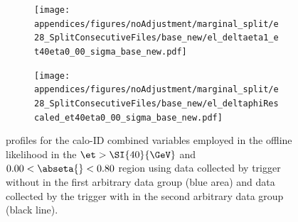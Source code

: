 \begin{figure}[t]
\begin{center}
\begin{subfigure}[c]{.48\textwidth}
\centering
\texttt{[image: appendices/figures/noAdjustment/marginal\_split/e28\_SplitConsecutiveFiles/base\_new/el\_deltaeta1\_et40eta0\_00\_sigma\_base\_new.pdf]}
\caption{}%
\label{fig:groups_homogeneity_deta}
\end{subfigure}
\begin{subfigure}[c]{.48\textwidth}
\centering
\texttt{[image: appendices/figures/noAdjustment/marginal\_split/e28\_SplitConsecutiveFiles/base\_new/el\_deltaphiRescaled\_et40eta0\_00\_sigma\_base\_new.pdf]}
\caption{}%
\label{fig:groups_homogeneity_dphi}
\end{subfigure}
\caption{%
profiles for the calo-ID combined variables employed in
the offline likelihood in the $\et>\SI{40}{\GeV}$ and $0.00<\abseta{}<0.80$
region using data collected by trigger without \rnn{} in the first arbitrary
data group (blue area) and data collected by the trigger with \rnn{} in the
second arbitrary data group (black line).
}%
\label{fig:groups_homogeneity_caloid}
\end{center}
\end{figure}

\FloatBarrier

